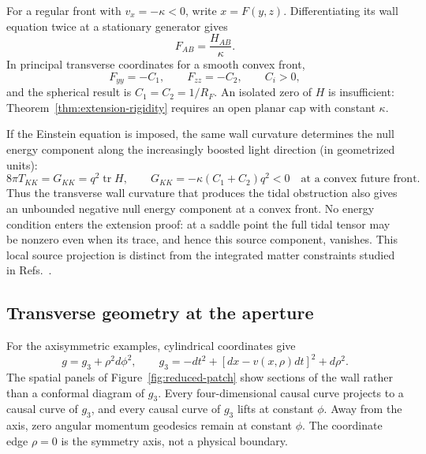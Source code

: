 For a regular front with \(v_x=-\kappa<0\), write \(x=F(y,z)\).
Differentiating its wall equation twice at a stationary generator gives
\begin{equation}
  F_{AB}=\frac{H_{AB}}{\kappa}.
  \label{eq:wall-graph-hessian}
\end{equation}
In principal transverse coordinates for a smooth convex front,
\begin{equation}
  F_{yy}=-C_1,\qquad F_{zz}=-C_2,\qquad C_i>0,
\end{equation}
and the spherical result is \(C_1=C_2=1/R_F\).  An isolated zero of \(H\) is
insufficient: Theorem~\ref{thm:extension-rigidity} requires an open planar cap
with constant \(\kappa\).

If the Einstein equation is imposed, the same wall curvature determines the
null energy component along the increasingly boosted light direction (in
geometrized units):
\begin{equation}
  8\pi T_{KK}=G_{KK}=q^2\operatorname{tr}H,
  \qquad
  G_{KK}=-\kappa(C_1+C_2)q^2<0
  \quad\text{at a convex future front}.
  \label{eq:null-source}
\end{equation}
Thus the transverse wall curvature that produces the tidal obstruction also
gives an unbounded negative null energy component at a convex front.  No energy
condition enters the extension proof: at a saddle point the full tidal tensor
may be nonzero even when its trace, and hence this source component, vanishes.
This local source projection is distinct from the integrated matter
constraints studied in Refs.~\cite{PfenningFord1997,LoboVisser2004}.


\subsection*{Transverse geometry at the aperture}
\label{app:meridional-diagrams}

For the axisymmetric examples, cylindrical coordinates give
\begin{equation}
  g=g_3+\rho^2d\phi^2,\qquad
  g_3=-dt^2+[dx-v(x,\rho)dt]^2+d\rho^2.
  \label{eq:meridional-quotient}
\end{equation}
The spatial panels of Figure~\ref{fig:reduced-patch} show sections of the
wall rather than a conformal diagram of \(g_3\).  Every four-dimensional causal curve projects
to a causal curve of \(g_3\), and every causal curve of \(g_3\) lifts at
constant \(\phi\).  Away from the axis, zero angular momentum geodesics
remain at constant \(\phi\).  The coordinate edge \(\rho=0\) is the symmetry axis, not a
physical boundary.

